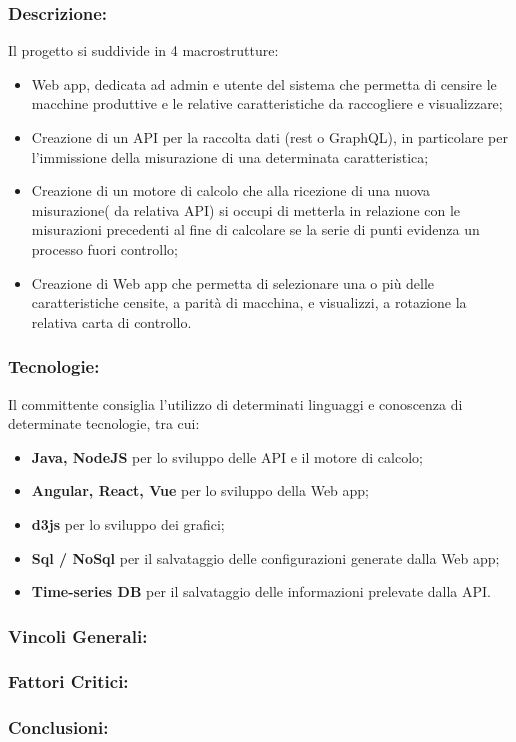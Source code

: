 \subsubsection{Descrizione:}
Il progetto si suddivide in 4 macrostrutture:
\begin{itemize}
	\item Web app, dedicata ad admin e utente del sistema che permetta di censire le macchine produttive e le relative caratteristiche da raccogliere e visualizzare;
	\item Creazione di un API per la raccolta dati (rest o GraphQL), in particolare per l'immissione della misurazione di una determinata caratteristica;
	\item Creazione di un motore di calcolo che alla ricezione di una nuova misurazione( da relativa API) si occupi di metterla in relazione con le misurazioni precedenti al fine di calcolare se la serie di punti evidenza un processo fuori controllo; 
	\item Creazione di Web app che permetta di selezionare una o più delle caratteristiche censite, a parità di macchina, e visualizzi, a rotazione la relativa carta di controllo.
\end{itemize}

\subsubsection{Tecnologie:}
Il committente consiglia l'utilizzo di determinati linguaggi e conoscenza di determinate tecnologie, tra cui:
\begin{itemize}
	\item \textbf{Java, NodeJS} per lo sviluppo delle API e il motore di calcolo;
	\item \textbf{Angular, React, Vue} per lo sviluppo della Web app;
	\item \textbf{d3js} per lo sviluppo dei grafici;
	\item \textbf{Sql / NoSql} per il salvataggio delle configurazioni generate dalla Web app;
	\item \textbf{Time-series DB} per il salvataggio delle informazioni prelevate dalla API.
\end{itemize}

\subsubsection{Vincoli Generali:}

\subsubsection{Fattori Critici:}

\subsubsection{Conclusioni:}
